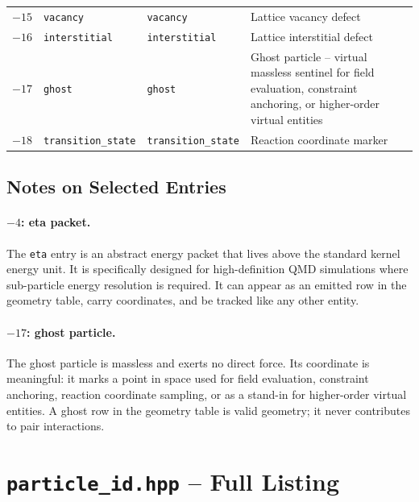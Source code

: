 \documentclass[11pt,a4paper]{article}
\begin{document}
\begin{center}
\begin{tabular}{rllp{6.2cm}}
$-15$ & \texttt{vacancy}            & \texttt{vacancy}           & Lattice vacancy defect \\
$-16$ & \texttt{interstitial}       & \texttt{interstitial}      & Lattice interstitial defect \\
$-17$ & \texttt{ghost}              & \texttt{ghost}             & Ghost particle -- virtual
                                                                    massless sentinel for field
                                                                    evaluation, constraint
                                                                    anchoring, or higher-order
                                                                    virtual entities \\
$-18$ & \texttt{transition\_state}  & \texttt{transition\_state} & Reaction coordinate marker \\
\bottomrule
\end{tabular}
\end{center}

\subsection{Notes on Selected Entries}

\paragraph{$-4$: eta packet.}
The \texttt{eta} entry is an abstract energy packet that lives above the
standard kernel energy unit.  It is specifically designed for
high-definition QMD simulations where sub-particle energy resolution is
required.  It can appear as an emitted row in the geometry table, carry
coordinates, and be tracked like any other entity.

\paragraph{$-17$: ghost particle.}
The ghost particle is massless and exerts no direct force.  Its coordinate
is meaningful: it marks a point in space used for field evaluation,
constraint anchoring, reaction coordinate sampling, or as a stand-in for
higher-order virtual entities.  A ghost row in the geometry table is valid
geometry; it never contributes to pair interactions.

\section{\texttt{particle\_id.hpp} -- Full Listing}
\end{document}
